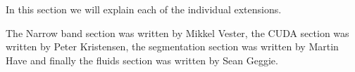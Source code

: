 In this section we will explain each of the individual extensions.

The Narrow band section was written by Mikkel Vester, the CUDA section was written by Peter Kristensen, the segmentation section was written by Martin Have and finally the fluids section was written by Sean Geggie.


